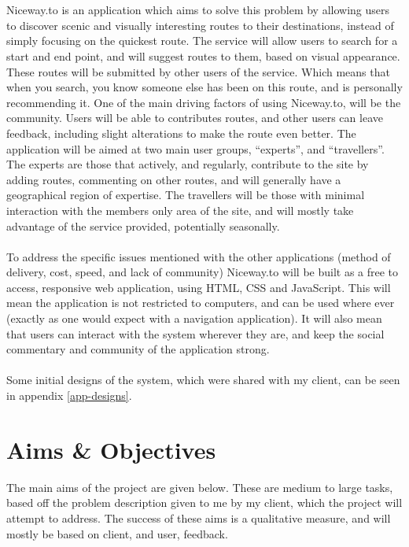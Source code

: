 \documentclass[a4paper,twoside,notitlepage,11pt]{article}
\begin{document}
\ \\
\ \\
Niceway.to is an application which aims to solve this problem by allowing users to discover scenic and visually interesting routes to their destinations, instead of simply focusing on the quickest route. The service will allow users to search for a start and end point, and will suggest routes to them, based on visual appearance. These routes will be submitted by other users of the service. Which means that when you search, you know someone else has been on this route, and is personally recommending it. One of the main driving factors of using Niceway.to, will be the community. Users will be able to contributes routes, and other users can leave feedback, including slight alterations to make the route even better. The application will be aimed at two main user groups, ``experts'', and ``travellers''. The experts are those that actively, and regularly, contribute to the site by adding routes, commenting on other routes, and will generally have a geographical region of expertise. The travellers will be those with minimal interaction with the members only area of the site, and will mostly take advantage of the service provided, potentially seasonally.
\ \\
\ \\
To address the specific issues mentioned with the other applications (method of delivery, cost, speed, and lack of community) Niceway.to will be built as a free to access, responsive web application, using HTML, CSS and JavaScript. This will mean the application is not restricted to computers, and can be used where ever (exactly as one would expect with a navigation application). It will also mean that users can interact with the system wherever they are, and keep the social commentary and community of the application strong.\ \\
\ \\
Some initial designs of the system, which were shared with my client, can be seen in appendix \ref{app-designs}.

\newpage 
\section{Aims \& Objectives}
The main aims of the project are given below. These are medium to large tasks, based off the problem description given to me by my client, which the project will attempt to address. The success of these aims is a qualitative measure, and will mostly be based on client, and user, feedback.
\end{document}
